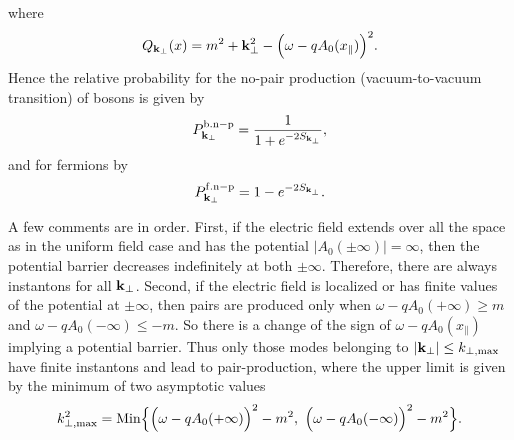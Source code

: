 \documentclass[a4paper,prd,showpacs,preprintnumbers,amsmath,amssymb]{revtex4}
\begin{document}
where
\begin{equation}
Q_{{\bf k}_{\perp}}(x) = m^2 + {\bf k}_{\perp}^2 - \Bigl( \omega -
q A_0 ( x_{\parallel}) \Bigr)^2.
\end{equation}
Hence the relative probability for the no-pair production
(vacuum-to-vacuum transition) of bosons is given by
\begin{equation}
P^{\rm b.n-p}_{{\bf k}_{\perp}} = \frac{1}{1+ e^{- 2 S_{{\bf
k}_{\perp}}}},
\end{equation}
and for fermions by
\begin{equation}
P^{\rm f.n-p}_{{\bf k}_{\perp}} = 1 - e^{- 2 S_{{\bf k}_{\perp}}}.
\end{equation}



A few comments are in order. First, if the electric field extends
over all the space as in the uniform field case and has the
potential $\vert A_0 (\pm \infty) \vert = \infty$, then the
potential barrier decreases indefinitely at both $\pm \infty$.
Therefore, there are always instantons for all ${\bf k}_{\perp}$.
Second, if the electric field is localized or has finite values of
the potential at $\pm \infty$, then pairs are produced only when
$\omega - q A_0 (+\infty) \geq m$ and $\omega - q A_0 (- \infty)
\leq - m$. So there is a change of the sign of $\omega - q A_0
(x_{\parallel})$ implying a potential barrier. Thus only those
modes belonging to $ \vert {\bf k}_{\perp} \vert \leq k_{\perp,
{\rm max}}$ have finite instantons and lead to pair-production,
where the upper limit is given by the minimum of two asymptotic
values
\begin{equation}
{k}_{\perp, {\rm max}}^2 = {\rm Min} \Bigl\{ \Bigl(\omega - q A_0
(+ \infty) \Bigr)^2 - m^2, ~\Bigl(\omega - q A_0 (- \infty)
\Bigr)^2 - m^2 \Bigr\}.
\end{equation}
\end{document}
